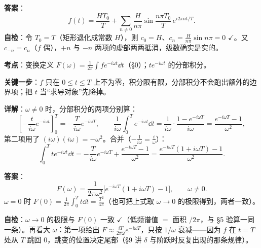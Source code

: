 \documentclass[11pt]{ctexart}
\begin{document}
\textbf{答案}：
\[ f(t)=\frac{HT_0}{T}+\sum_{n\neq0}\frac{H}{n\pi}\sin\frac{n\pi T_0}{T}\,e^{i2\pi nt/T} .\]
\textbf{自检}：令 $T_0=T$（矩形退化成常数 $H$），则 $c_0=H$、$c_n=\frac{H}{n\pi}\sin n\pi=0$ $\checkmark$。又 $c_{-n}=c_n$（$f$ 偶），$+n$ 与 $-n$ 两项的虚部两两抵消，级数确实是实的。

\qbreak



\textbf{考点}：变换定义 $F(\omega)=\frac1{2\pi}\int fe^{-i\omega t}\dd t$（§0）；$te^{-i\omega t}$ 的分部积分。

\textbf{关键一步}：$f$ 只在 $0\le t\le T$ 上不为零，积分限有限，分部积分不会跑出额外的边界项；把 $t$ 当“求导对象”先降掉。

\textbf{详解}：$\omega\neq0$ 时，分部积分的两项分别算：
\[
\left[-\frac{t}{i\omega}e^{-i\omega t}\right]_0^{T}=-\frac{T}{i\omega}e^{-i\omega T},\qquad
\frac{1}{i\omega}\int_0^{T}e^{-i\omega t}\dd t=\frac{1}{i\omega}\cdot\frac{1-e^{-i\omega T}}{i\omega}=\frac{e^{-i\omega T}-1}{\omega^2},
\]
第二项用了 $(i\omega)(i\omega)=-\omega^2$。合并（$-\frac{1}{i\omega}=\frac{i}{\omega}$）：
\[
\int_0^{T}te^{-i\omega t}\dd t
=-\frac{T}{i\omega}e^{-i\omega T}+\frac{e^{-i\omega T}-1}{\omega^2}
=\frac{e^{-i\omega T}(1+i\omega T)-1}{\omega^2} .
\]

\textbf{答案}：
\[ F(\omega)=\frac{1}{2\pi\omega^2}\Big[e^{-i\omega T}(1+i\omega T)-1\Big],\qquad \omega\neq0 .\]
$\omega=0$ 时 $F(0)=\frac{1}{2\pi}\int_0^{T}t\dd t=\frac{T^2}{4\pi}$（也可把上式取 $\omega\to0$ 的极限得到，两者一致）。

\textbf{自检}：$\omega\to0$ 的极限与 $F(0)$ 一致 $\checkmark$（低频谱值 $=$ 面积 $/2\pi$，与 §5 验算一同一条）。再看大 $\omega$：第一项给出 $F\approx\frac{iT}{2\pi\omega}e^{-i\omega T}$，只按 $1/\omega$ 衰减——因为 $f$ 在 $t=T$ 处从 $T$ 跳回 $0$，跳变的位置决定尾部（§9 讲 $\delta$ 与阶跃时反复出现的那条规律）。

\qbreak


\end{document}
